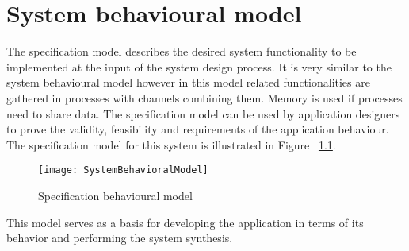 
\chapter{System behavioural model}
\label{cha:sysBehMod}

The specification model describes the desired system functionality to be implemented at the input of the system design process. It is very similar to the system behavioural model however in this model related functionalities are gathered in processes with channels combining them. Memory is used if processes need to share data. The specification model can be used by application designers to prove the validity, feasibility and requirements of the application behaviour.
The specification model for this system is illustrated in Figure ~\ref{fig:SpecificationModel}.

\begin{figure}[H]
\centering
\texttt{[image: SystemBehavioralModel]}
\caption{Specification behavioural model}
\label{fig:SpecificationModel}
\end{figure}


This model serves as a basis for developing the application in terms of its behavior and performing the system synthesis.